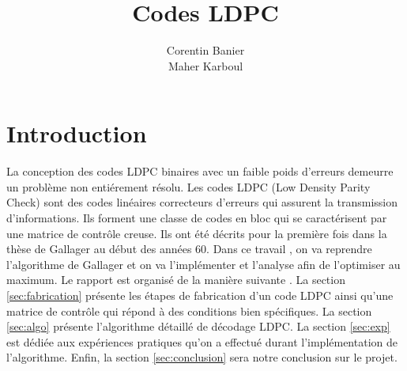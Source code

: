 \documentclass[french,nochapter,11pt]{rapportUB}
\author{ %
  Corentin Banier
  \\
  Maher Karboul
}
\begin{document}
\title{Codes LDPC}

\maketitle

\begin{center}
\tableofcontents %
\clearpage
\end{center}



\section{Introduction}
\label{sec:introduction}
La conception des codes LDPC binaires avec un faible poids d'erreurs demeurre un problème non entiérement résolu. 
Les codes LDPC (Low Density Parity Check) sont des codes linéaires correcteurs d'erreurs qui assurent la transmission d'informations. 
Ils forment une classe de codes en bloc qui se caractérisent par une matrice de contrôle creuse. Ils ont été décrits pour la première 
fois dans la thèse de Gallager au début des années 60. Dans ce travail , on va reprendre l'algorithme de Gallager et on va l'implémenter 
et l'analyse afin de l'optimiser au maximum.\newline
Le rapport est organisé de la manière suivante . La section \ref{sec:fabrication} présente les étapes de fabrication d'un code LDPC 
ainsi qu'une matrice de contrôle qui répond à des conditions bien spécifiques. La section \ref{sec:algo} présente l'algorithme 
détaillé de décodage LDPC. La section \ref{sec:exp} est dédiée aux expériences pratiques qu'on a effectué durant l'implémentation 
de l'algorithme. Enfin, la section \ref{sec:conclusion} sera notre conclusion sur le projet.
\end{document}
